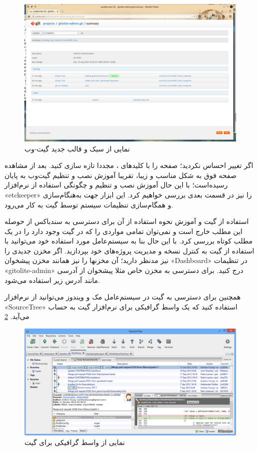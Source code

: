  \begin{figure}
     \includegraphics[width=.9\textwidth ,height=.60\textwidth]{Pic/GIT-WEB-NEW}
     \caption{ نمایی از سبک و قالب جدید گیت-وب 
        }
        \label{GIT-WEB-NEW}
    \end{figure}

اگر تغییر احساس نکردید؛ صفحه را با کلیدهای 
، مجددا تازه سازی کنید. بعد از مشاهده صفحه فوق به شکل مناسب و زیبا، تقریبا آموزش نصب و تنظیم گیت‌وب به پایان رسیده‌است؛ با این حال آموزش نصب و تنظیم و چگونگی استفاده از نرم‌افزار «etckeeper» را نیز در قسمت بعدی بررسی خواهیم کرد. این ابزار جهت به‌هنگام‌سازی و همگام‌سازی تنظیمات سیستم توسط گیت به کار می‌رود.

استفاده از گیت و آموزش نحوه استفاده از آن برای دسترسی به سندباکس از حوصله این مطلب خارج است و نمی‌توان تمامی مواردی را که در گیت وجود دارد را در یک مطلب کوتاه بررسی کرد. با این حال بنا به سیستم‌عامل مورد استفاده خود می‌توانید با استفاده از گیت به کنترل نسخه و مدیریت پروژه‌های خود بپردازید. اگر مخزن جدیدی را نیز مدنظر دارید؛ آن مخزنها را نیز همانند مخزن پیشخوان «Dashboard» در تنظیمات «gitolite-admin» درج کنید. برای دسترسی به مخزن خاص مثلا پیشخوان از آدرسی مانند آدرس زیر استفاده می‌شود.
\newline

\begin{latin}  
    
\end{latin}

همچنین برای دسترسی به گیت در سیستم‌عامل مک و ویندوز می‌توانید از نرم‌افزار «SourceTree» استفاده کنید که یک واسط گرافیکی برای نرم‌افزار گیت به حساب می‌آید. \ref{GIT-GUI}

 \begin{figure}
 \includegraphics[width=.9\textwidth ,height=.50\textwidth]{Pic/GIT-GUI-WIN}
 \caption{ نمایی از واسط گرافیکی برای گیت 
  }
\label{GIT-GUI}
\end{figure}